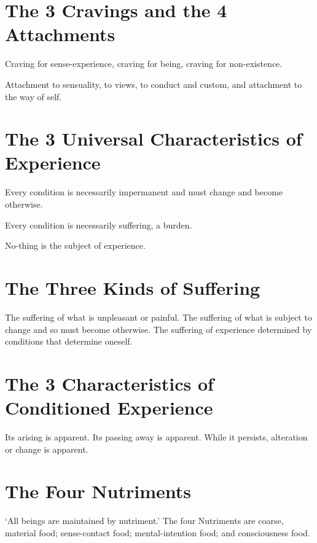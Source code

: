
\section{The 3 Cravings and the 4 Attachments}

Craving for sense-experience, craving for being, craving for non-existence.

Attachment to sensuality, to views, to conduct and custom, and attachment to the
way of self.


\section{The 3 Universal Characteristics of Experience}

Every condition is necessarily impermanent and must change and become otherwise.

Every condition is necessarily suffering, a burden.

No-thing is the subject of experience.


\section{The Three Kinds of Suffering}

The suffering of what is unpleasant or painful. The suffering of what is subject
to change and so must become otherwise. The suffering of experience determined
by conditions that determine oneself.


\section{The 3 Characteristics of Conditioned Experience}

Its arising is apparent. Its passing away is apparent. While it persists,
alteration or change is apparent.


\section{The Four Nutriments}

‘All beings are maintained by nutriment.’ The four Nutriments are coarse,
material food; sense-contact food; mental-intention food; and consciousness
food.

